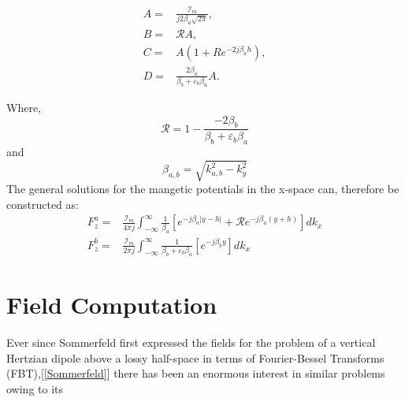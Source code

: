 \documentclass{article}
\begin{document}
  \begin{subequations}
    \begin{align}
      A ={}& \frac{\mathcal{I}_m}{j2\beta_a \sqrt{2\pi}}, \\
      B ={}& \mathcal{R} A, \\
      C ={}& A \left( 1 + Re^{-2j\beta_a h} \right), \\
      D ={}& \frac{2\beta_a}{\beta_b + \varepsilon_b \beta_a} A.
    \end{align}
  \end{subequations}

  Where,
  \begin{equation}
    \mathcal{R} = 1 - \frac{-2\beta_b}{\beta_b + \varepsilon_b \beta_a}
  \end{equation}
  and
  \begin{equation}
    \beta_{a,b} = \sqrt{k_{a,b}^2 - k_y^2}
  \end{equation}
The general solutions for the mangetic potentials in the x-space can, therefore be constructed as:
\begin{subequations}
  \begin{align}
    F_z^a ={}& \frac{\mathcal{I}_m}{4 \pi j}\int_{-\infty}^{\infty} \frac{1}{\beta_a} \left[ e^{-j \beta_a |y - h|} + \mathcal{R} e^{-j \beta_a (y + h)} \right] dk_x \\
    F_z^b ={}& \frac{\mathcal{I}_m}{2 \pi j}\int_{-\infty}^{\infty} \frac{1}{\beta_b + \varepsilon_b \beta_a} \left[e^{-j \beta_b y} \right] dk_x
  \end{align}
  \label{eq:potentials}
\end{subequations}

\section{Field Computation}

Ever since Sommerfeld first expressed the fields for the problem of a vertical Hertzian dipole above a lossy half-space in terms of Fourier-Bessel Transforms (FBT),[\ref{Sommerfeld}] there has been an enormous interest in similar problems owing to its 




% 
% 
\end{document}
